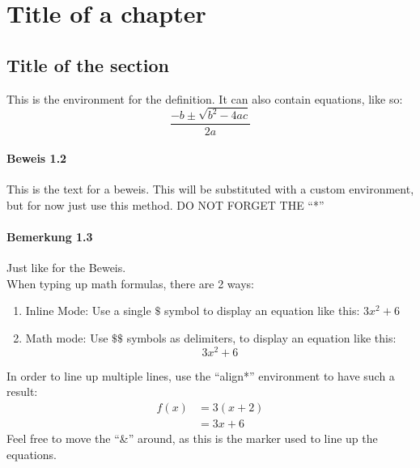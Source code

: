 \documentclass[a4paper]{book}
\begin{document}
\chapter{Title of a chapter}

\section{Title of the section}
\begin{definition}{1.1}
This is the environment for the definition. It can also contain equations, like so:
\[\frac{{ - b \pm \sqrt {{b^2} - 4ac} }}{{2a}}\]
\end{definition}

\subsubsection*{Beweis 1.2}
This is the text for a beweis. This will be substituted with a custom environment, but for now just use this method. DO NOT FORGET THE ``*''

\subsubsection*{Bemerkung 1.3}
Just like for the Beweis.\\

\noindent When typing up math formulas, there are 2 ways:
\begin{enumerate}
\item Inline Mode: Use a single $\$$ symbol to display an equation like this: $3x^2+6$
\item Math mode: Use $\$\$$ symbols as delimiters, to display an equation like this: $$3x^2+6$$
\end{enumerate}


In order to line up multiple lines, use the ``align*'' environment to have such a result: 
\begin{align*}
	f(x) & =3(x+2)\\	
	& = 3x+6
\end{align*}
Feel free to move the ``\&'' around, as this is the marker used to line up the equations. 
\end{document}
